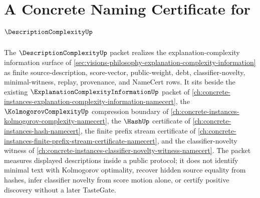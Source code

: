 \chapter{A Concrete Naming Certificate for $\DescriptionComplexityUp$}
\label{ch:concrete-instances-description-complexity-namecert}

The $\DescriptionComplexityUp$ packet realizes the explanation-complexity information surface of \autoref{sec:visions-philosophy-explanation-complexity-information} as finite source-description, score-vector, public-weight, debt, classifier-novelty, minimal-witness, replay, provenance, and NameCert rows. It sits beside the existing $\ExplanationComplexityInformationUp$ packet of \autoref{ch:concrete-instances-explanation-complexity-information-namecert}, the $\KolmogorovComplexityUp$ compression boundary of \autoref{ch:concrete-instances-kolmogorov-complexity-namecert}, the $\HashUp$ certificate of \autoref{ch:concrete-instances-hash-namecert}, the finite prefix stream certificate of \autoref{ch:concrete-instances-finite-prefix-stream-certificate-namecert}, and the classifier-novelty witness of \autoref{ch:concrete-instances-classifier-novelty-witness-namecert}. The packet measures displayed descriptions inside a public protocol; it does not identify minimal text with Kolmogorov optimality, recover hidden source equality from hashes, infer classifier novelty from score motion alone, or certify positive discovery without a later TasteGate.

